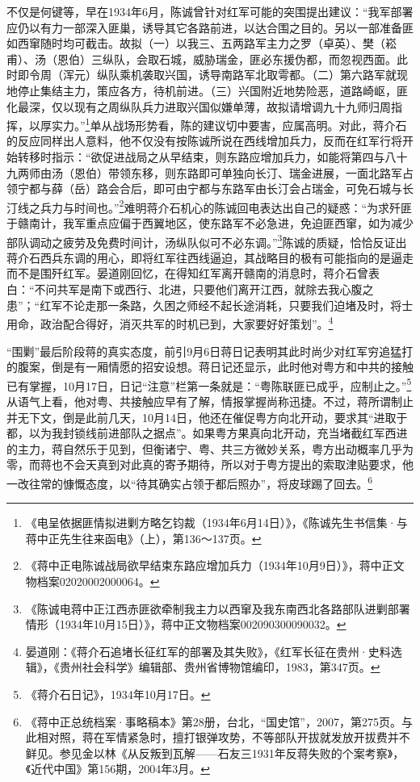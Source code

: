 不仅是何键等，早在1934年6月，陈诚曾针对红军可能的突围提出建议：“我军部署应仍以有力一部深入匪巢，诱导其它各路前进，以达合围之目的。另以一部准备匪如西窜随时均可截击。故拟（一）以我三、五两路军主力之罗（卓英）、樊（崧甫）、汤（恩伯）三纵队，会取石城，威胁瑞金，匪必东援伪都，而忽视西面。此时即令周（浑元）纵队乘机袭取兴国，诱导南路军北取雩都。（二）第六路军就现地停止集结主力，策应各方，待机前进。（三）兴国附近地势险恶，道路崎岖，匪化最深，仅以现有之周纵队兵力进取兴国似嫌单薄，故拟请增调九十九师归周指挥，以厚实力。”\footnote{《电呈依据匪情拟进剿方略乞钧裁（1934年6月14日）》，《陈诚先生书信集·与蒋中正先生往来函电》（上），第136～137页。}单从战场形势看，陈的建议切中要害，应属高明。对此，蒋介石的反应同样出人意料，他不仅没有按陈诚所说在西线增加兵力，反而在红军行将开始转移时指示：“欲促进战局之从早结束，则东路应增加兵力，如能将第四与八十九两师由汤（恩伯）带领东移，则东路即可单独向长汀、瑞金进展，一面北路军占领宁都与薛（岳）路会合后，即可由宁都与东路军由长汀会占瑞金，可免石城与长汀线之兵力与时间也。”\footnote{《蒋中正电陈诚战局欲早结束东路应增加兵力（1934年10月9日）》，蒋中正文物档案02020002000064。}难明蒋介石机心的陈诚回电表达出自己的疑惑：“为求歼匪于赣南计，我军重点应偏于西翼地区，使东路军不必急进，免迫匪西窜，如为减少部队调动之疲劳及免费时间计，汤纵队似可不必东调。”\footnote{《陈诚电蒋中正江西赤匪欲牵制我主力以西窜及我东南西北各路部队进剿部署情形（1934年10月15日）》，蒋中正文物档案002090300090032。}陈诚的质疑，恰恰反证出蒋介石西兵东调的用心，即将红军往西线逼迫，其战略目的极有可能指向的是逼走而不是围歼红军。晏道刚回忆，在得知红军离开赣南的消息时，蒋介石曾表白：“不问共军是南下或西行、北进，只要他们离开江西，就除去我心腹之患”；“红军不论走那一条路，久困之师经不起长途消耗，只要我们迫堵及时，将士用命，政治配合得好，消灭共军的时机已到，大家要好好策划”。\footnote{晏道刚：《蒋介石追堵长征红军的部署及其失败》，《红军长征在贵州·史料选辑》，《贵州社会科学》编辑部、贵州省博物馆编印，1983，第347页。}


“围剿”最后阶段蒋的真实态度，前引9月6日蒋日记表明其此时尚少对红军穷追猛打的腹案，倒是有一厢情愿的招安设想。蒋日记还显示，此时他对粤方和中共的接触已有掌握，10月17日，日记“注意”栏第一条就是：“粤陈联匪已成乎，应制止之。”\footnote{《蒋介石日记》，1934年10月17日。}从语气上看，他对粤、共接触应早有了解，情报掌握尚称迅捷。不过，蒋所谓制止并无下文，倒是此前几天，10月14日，他还在催促粤方向北开动，要求其“进取于都，以为我封锁线前进部队之据点”。如果粤方果真向北开动，充当堵截红军西进的主力，蒋自然乐于见到，但衡诸宁、粤、共三方微妙关系，粤方出动概率几乎为零，而蒋也不会天真到对此真的寄予期待，所以对于粤方提出的索取津贴要求，他一改往常的慷慨态度，以“待其确实占领于都后照办”，将皮球踢了回去。\footnote{《蒋中正总统档案·事略稿本》第28册，台北，“国史馆”，2007，第275页。与此相对照，蒋在军情紧急时，擅打银弹攻势，不等部队开拔就发放开拔费并不鲜见。参见金以林《从反叛到瓦解——石友三1931年反蒋失败的个案考察》，《近代中国》第156期，2004年3月。}


